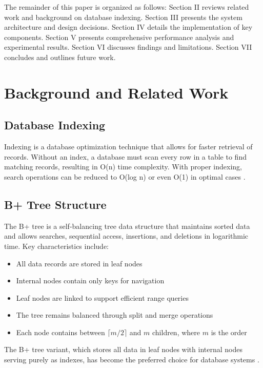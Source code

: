 \documentclass[conference]{IEEEtran}
\begin{document}
The remainder of this paper is organized as follows: Section II reviews related work and background on database indexing. Section III presents the system architecture and design decisions. Section IV details the implementation of key components. Section V presents comprehensive performance analysis and experimental results. Section VI discusses findings and limitations. Section VII concludes and outlines future work.

\section{Background and Related Work}

\subsection{Database Indexing}

Indexing is a database optimization technique that allows for faster retrieval of records. Without an index, a database must scan every row in a table to find matching records, resulting in O(n) time complexity. With proper indexing, search operations can be reduced to O(log n) or even O(1) in optimal cases \cite{silberschatz2010database}.

\subsection{B+ Tree Structure}

The B+ tree is a self-balancing tree data structure that maintains sorted data and allows searches, sequential access, insertions, and deletions in logarithmic time. Key characteristics include:

\begin{itemize}
    \item All data records are stored in leaf nodes
    \item Internal nodes contain only keys for navigation
    \item Leaf nodes are linked to support efficient range queries
    \item The tree remains balanced through split and merge operations
    \item Each node contains between $\lceil m/2 \rceil$ and $m$ children, where $m$ is the order
\end{itemize}

The B+ tree variant, which stores all data in leaf nodes with internal nodes serving purely as indexes, has become the preferred choice for database systems \cite{graefe2011modern}.
\end{document}
